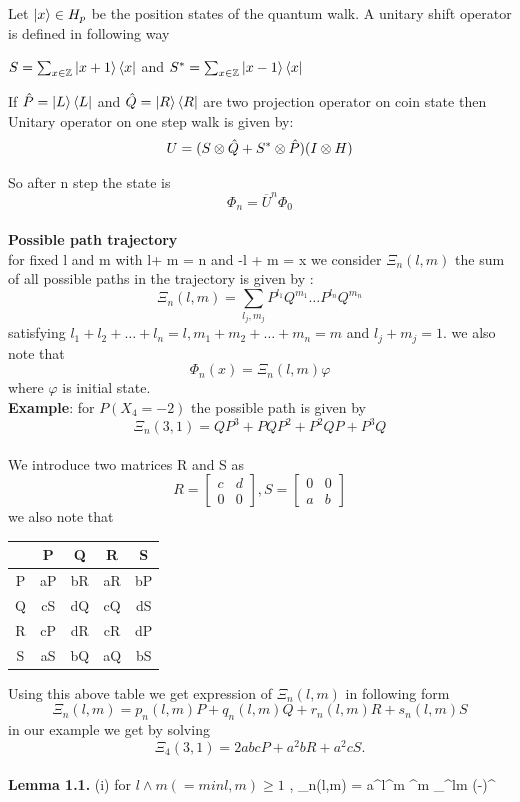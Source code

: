 \documentclass[11 pt]{article}
\theoremstyle{definition}
\theoremstyle{remark}
\newcommand{\tens}[1]{
  \mathbin{\mathop{\otimes}\limits_{#1}}}
\begin{document}
Let $\ket{x} \in H_p$ be the position states of the quantum walk. A unitary shift operator is defined in following way  
\begin{center}
    $S = \sum_{x \in \mathbb{Z}} \ket{x+1}\bra{x}$ and 
    $S^* = \sum_{x \in \mathbb{Z}} \ket{x-1}\bra{x}$
\end{center}
If $\Hat{P} = \ket{L}\bra{L}$ and $\Hat{Q}= \ket{R}\bra{R}$ are two projection operator on coin state then Unitary operator on one step walk is given by:
$$  U = ( S \tens{} \Hat{Q} + S^* \tens{} \Hat{P})(I \tens{} H)$$
So after n step the state is 
$$\Phi_n = \overline{U}^n\Phi_0$$
\\
\textbf{Possible path trajectory}\\
for fixed l and m with l+ m = n and -l + m = x we consider $\Xi_n(l,m)$ the sum of all possible paths in the trajectory is given by :
$$ \Xi_n(l,m) = \sum_{l_j,m_j} P^{l_1}Q^{m_1} \hdots P^{l_n}Q^{m_n}  $$
satisfying $l_1 + l_2 + \hdots + l_n=l, m_1 + m_2+ \hdots +m_n = m$ and $l_j + m_j = 1$.
we also note that
$$ \Phi_n(x) = \Xi_n(l,m) \varphi$$ where $\varphi$ is initial state.\\
\textbf{Example}: for $P(X_4 =-2)$ the possible path is given by
$$  \Xi_n(3,1) = QP^3 + PQP^2 + P^2QP + P^3Q$$
\\
We introduce two matrices R and S as
$$  R= \begin{bmatrix}
        c&d\\
        0&0
\end{bmatrix}, S=\begin{bmatrix}
    0&0\\
    a&b
\end{bmatrix}$$
we also note that
\begin{center}
\begin{tabular}{ c | c  c  c  c  }
   & P & Q & R & S\\
   \hline
  P & aP & bR & aR & bP\\
  Q & cS & dQ & cQ & dS\\
  R & cP & dR & cR & dP\\
  S & aS & bQ & aQ & bS
\end{tabular}
\end{center}
Using this above table we get expression of $\Xi_n(l,m)$ in following form $$\Xi_n(l,m) = p_n(l,m)P +q_n(l,m)Q +r_n(l,m)R + s_n(l,m)S $$
in our example we get by solving
    $$\Xi_4(3,1) = 2abcP + a^2bR + a^2cS.$$
\\
\textbf{Lemma 1.1.} (i) for $l \wedge m(= min{l,m}) \geq 1$ , 
$$\Xi_n(l,m) = a^l^m \triangle^m \sum_{}^{l\wedge m} \bigg(-\bigg)^{\gamma}  \cross \bigg[\frac{l-\gamma}{a\gamma}P + \frac{m-\gamma}{\triangle\overline{a}\gamma}Q + \frac{1}{\triangle\overline{b}}R + \frac{1}{b}S}\bigg]  $$
\end{document}
